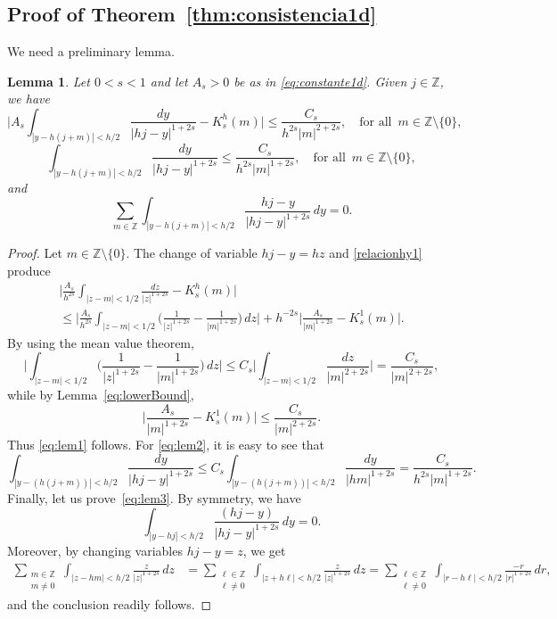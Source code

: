\documentclass[a4paper,11pt,reqno]{amsart}
\newcommand{\Z}{\mathbb{Z}}
\newtheorem{lem}[thm]{Lemma}
\theoremstyle{definition}
\numberwithin{equation}{section}
\begin{document}
\subsection{Proof of Theorem~\ref{thm:consistencia1d}}
\label{sec:ProofConsistency}

We need a preliminary lemma.

\begin{lem}
\label{lem:compa}
Let $0<s<1$ and let $A_s>0$ be as in \eqref{eq:constante1d}. Given $j\in \Z$, we have
\begin{equation}
\label{eq:lem1}
\bigg|A_s\int_{|y-h(j+m)|<h/2}\frac{dy}{|hj-y|^{1+2s}}-K^h_s(m)\bigg|\le \frac{C_s}{h^{2s}|m|^{2+2s}}, \quad \text{for all }\, m\in \Z\setminus\{0\},
\end{equation}
\begin{equation}
\label{eq:lem2}
\int_{|y-h(j+m)|<h/2}\frac{dy}{|hj-y|^{1+2s}}\le \frac{C_s}{h^{2s}|m|^{1+2s}},\quad \text{for all }\, m\in \Z\setminus\{0\},
\end{equation}
and
\begin{equation}
\label{eq:lem3}
\sum_{m\in \Z} \int_{|y-h(j+m)|<h/2} \frac{hj-y}{|hj-y|^{1+2s}}\,dy = 0.
\end{equation}
\end{lem}

\begin{proof}
Let $m\in \Z\setminus\{0\}$.
The change of variable $hj-y=hz$ and \eqref{relacionhy1} produce
\begin{multline*}
\bigg|\frac{A_s}{h^{2s}} \int_{|z-m|<1/2} \frac{dz}{|z|^{1+2s}}-K^h_s(m)\bigg| \\
\le \bigg|\frac{A_s}{h^{2s}} \int_{|z-m|<1/2} \bigg(\frac{1}{|z|^{1+2s}}-\frac{1}{|m|^{1+2s}}\bigg)\,dz\bigg|
+ h^{-2s}\bigg|\frac{A_s}{|m|^{1+2s}}-K^1_s(m)\bigg|.
\end{multline*}
By using the mean value theorem,
\[
\bigg|\int_{|z-m|<1/2} \bigg(\frac{1}{|z|^{1+2s}}-\frac{1}{|m|^{1+2s}}\bigg)\,dz\bigg|
\le C_s\bigg|\int_{|z-m|<1/2}\frac{dz}{|m|^{2+2s}}\bigg| = \frac{C_s}{|m|^{2+2s}},
\]
while by Lemma~\ref{eq:lowerBound},
\[
\bigg|\frac{A_s}{|m|^{1+2s}}-K^1_s(m)\bigg|\le \frac{C_s}{|m|^{2+2s}}.
\]
Thus \eqref{eq:lem1} follows. For \eqref{eq:lem2}, it is easy to see that
\[
\int_{|y-(h(j+m))|<h/2}\frac{dy}{|hj-y|^{1+2s}}
\le C_s\int_{|y-(h(j+m))|<h/2}\frac{dy}{|hm|^{1+2s}}
= \frac{C_s}{h^{2s}|m|^{1+2s}}.
\]
Finally, let us prove~\eqref{eq:lem3}. By symmetry, we have
\[
\int_{|y-hj|<h/2}\frac{(hj-y)}{|hj-y|^{1+2s}}\,dy = 0.
\]
Moreover, by changing variables $hj-y=z$, we get
\begin{align*}
\sum_{\substack{m\in \Z\\ m\neq 0}}
\int_{|z-hm|< h/2} \frac{z}{|z|^{1+2s}}\,dz
&= \sum_{\substack{\ell\in \Z\\ \ell\neq 0}}
\int_{|z+h\ell|< h/2} \frac{z}{|z|^{1+2s}}\,dz
= \sum_{\substack{\ell\in \Z\\ \ell\neq 0}}
\int_{|r-h\ell|< h/2} \frac{-r}{|r|^{1+2s}}\,dr,
\end{align*}
and the conclusion readily follows.
\end{proof}
\end{document}
